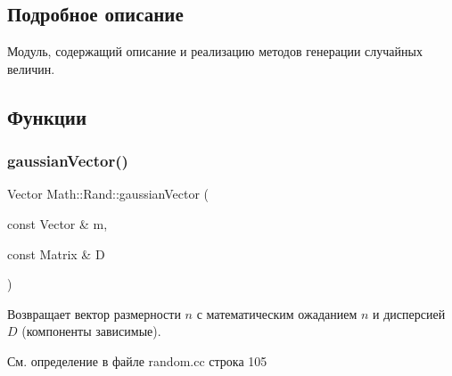 \subsection{Подробное описание}
Модуль, содержащий описание и реализацию методов генерации случайных величин. 

\subsection{Функции}
\hypertarget{namespace_math_1_1_rand_a9508f6778a02ce0f0be669cb32e25dc6}{}\label{namespace_math_1_1_rand_a9508f6778a02ce0f0be669cb32e25dc6} 
\subsubsection{\texorpdfstring{gaussian\+Vector()}{gaussianVector()}}
{\footnotesize\ttfamily Vector Math\+::\+Rand\+::gaussian\+Vector (\begin{DoxyParamCaption}\item[{const Vector \&}]{m,  }\item[{const Matrix \&}]{D }\end{DoxyParamCaption})}

Возвращает вектор размерности $n$ с математическим ожаданием $n$ и дисперсией $D$ (компоненты зависимые). 

См. определение в файле random.\+cc строка 105

